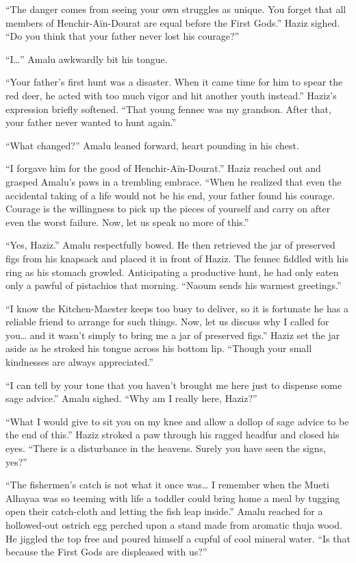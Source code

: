``The danger comes from seeing your own struggles as unique. You forget that all members of Henchir-Aïn-Dourat are equal before the First Gods.'' Haziz sighed. ``Do you think that your father never lost his courage?''

``I\ldots'' Amalu awkwardly bit his tongue.

``Your father's first hunt was a disaster. When it came time for him to spear the red deer, he acted with too much vigor and hit another youth instead.'' Haziz's expression briefly softened. ``That young fennec was my grandson. After that, your father never wanted to hunt again.''

``What changed?'' Amalu leaned forward, heart pounding in his chest.

``I forgave him for the good of Henchir-Aïn-Dourat.'' Haziz reached out and grasped Amalu's paws in a trembling embrace. ``When he realized that even the accidental taking of a life would not be his end, your father found his courage. Courage is the willingness to pick up the pieces of yourself and carry on after even the worst failure. Now, let us speak no more of this.''

``Yes, Haziz.'' Amalu respectfully bowed. He then retrieved the jar of preserved figs from his knapsack and placed it in front of Haziz. The fennec fiddled with his ring as his stomach growled. Anticipating a productive hunt, he had only eaten only a pawful of pistachios that morning. ``Naoum sends his warmest greetings.''

``I know the Kitchen-Maester keeps too busy to deliver, so it is fortunate he has a reliable friend to arrange for such things. Now, let us discuss why I called for you\ldots{} and it wasn't simply to bring me a jar of preserved figs.'' Haziz set the jar aside as he stroked his tongue across his bottom lip. ``Though your small kindnesses are always appreciated.''

``I can tell by your tone that you haven't brought me here just to dispense some sage advice.'' Amalu sighed. ``Why am I really here, Haziz?''

``What I would give to sit you on my knee and allow a dollop of sage advice to be the end of this.'' Haziz stroked a paw through his ragged headfur and closed his eyes. ``There is a disturbance in the heavens. Surely you have seen the signs, yes?''

``The fishermen's catch is not what it once was\ldots{} I remember when the Mueti Alhayaa was so teeming with life a toddler could bring home a meal by tugging open their catch-cloth and letting the fish leap inside.'' Amalu reached for a hollowed-out ostrich egg perched upon a stand made from aromatic thuja wood. He jiggled the top free and poured himself a cupful of cool mineral water. ``Is that because the First Gods are displeased with us?''

